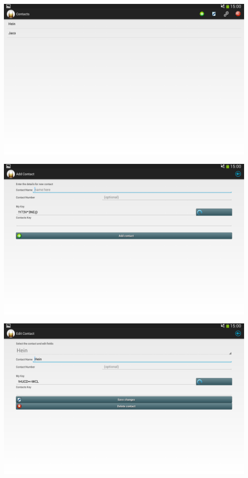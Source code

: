 \begin{center}
 \includegraphics[width=13cm]{screenshots/tablet/2_Contacts.png}
\end{center}
\begin{center}
 \includegraphics[width=13cm]{screenshots/tablet/3_AddContact.png}
\end{center}
\begin{center}
 \includegraphics[width=13cm]{screenshots/tablet/4_EditContact.png}
\end{center}
